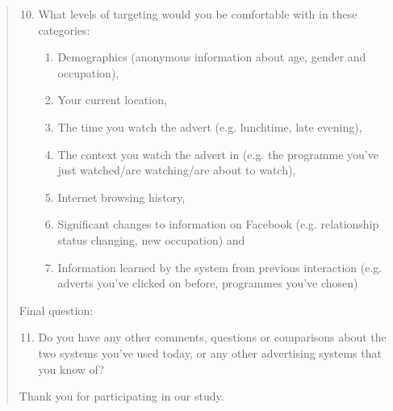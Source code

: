 \begin{quotation}
	\begin{enumerate}
	  	\setcounter{enumi}{9}
		\item What levels of targeting would you be comfortable with in these categories:
		\begin{enumerate}[label=\alph*]
			\item Demographics (anonymous information about age, gender and occupation),
			\item Your current location,
			\item The time you watch the advert (e.g. lunchtime, late evening),
			\item The context you watch the advert in (e.g. the programme you’ve just watched/are watching/are about to watch),
			\item Internet browsing history,
			\item Significant changes to information on Facebook (e.g. relationship status changing, new occupation)
			and
			\item Information learned by the system from previous interaction (e.g. adverts you've clicked on before, programmes you've chosen)
		\end{enumerate}
	\end{enumerate}

	Final question:

	\begin{enumerate}
	  	\setcounter{enumi}{10}
		\item Do you have any other comments, questions or comparisons about the two systems you've used today, or any other advertising systems that you know of?
	\end{enumerate}

	Thank you for participating in our study.
\end{quotation}